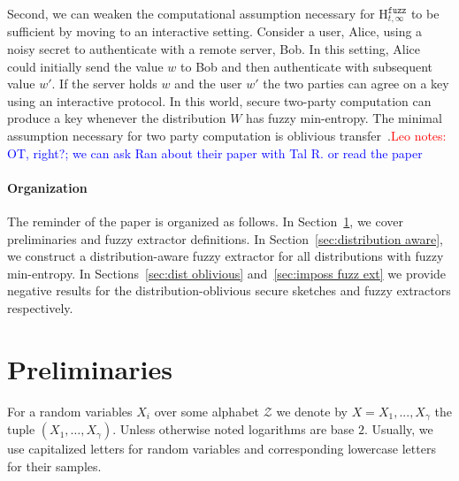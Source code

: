 \documentclass[11pt]{article}
\newcommand{\secref}[1]{\mbox{Section~\ref{#1}}}
\newcommand{\Hfuzz}{\mathrm{H}^{\mathtt{fuzz}}_{t,\infty}}
\newcommand{\authnote}[2]{{\textcolor{red}{\textsf{#1 notes: }\textcolor{blue}{ #2}}\marginpar{\textcolor{red}{\textbf{!!!!!}}}}}
\newcommand{\authnote}[2]{}
\newcommand{\lnote}[1]{{\authnote{Leo}{#1}}}
\begin{document}
Second, we can weaken the computational assumption necessary for $\Hfuzz$ to be sufficient by moving to an interactive setting.
Consider a user, Alice, using a noisy secret to authenticate with a remote server, Bob.  In this setting, Alice could initially send the value $w$ to Bob and then authenticate with subsequent value $w'$.  If the server holds $w$ and the user $w'$ the two parties can agree on a key using an interactive protocol.
In this world, secure two-party computation can produce a key whenever the distribution $W$ has fuzzy min-entropy.  The minimal assumption necessary for two party computation is oblivious transfer~\cite{lindell2009proof}.\lnote{OT, right?; we can ask Ran about their paper with Tal R. or read the paper}


\paragraph{Organization} The reminder of the paper is organized as follows.  In \secref{sec:preliminaries}, we cover preliminaries and fuzzy extractor definitions.  In \secref{sec:distribution aware}, we construct a distribution-aware fuzzy extractor for all distributions with fuzzy min-entropy.  In Sections~\ref{sec:dist oblivious} and~\ref{sec:imposs fuzz ext} we provide negative results for the distribution-oblivious secure sketches and fuzzy extractors respectively.



\section{Preliminaries}
\label{sec:preliminaries}
For a random variables $X_i$ over some alphabet $\mathcal{Z}$ we denote by $X = X_1,..., X_\gamma$  the tuple $(X_1,\dots, X_\gamma)$. %
 Unless otherwise noted logarithms are base $2$.
Usually, we use capitalized letters for random variables and corresponding lowercase letters for their samples.
\end{document}
